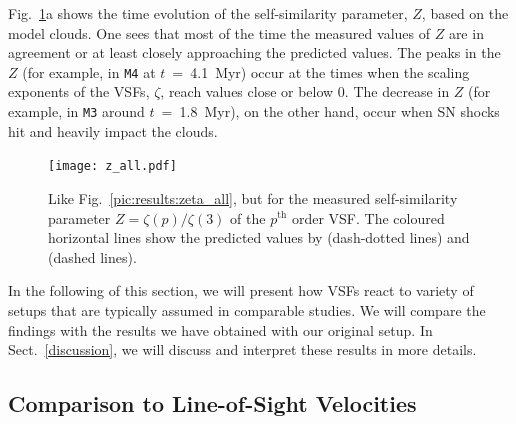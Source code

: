 Fig.~\ref{pic:results:z_all}a shows the time evolution of the self-similarity parameter, $Z$, based on the model clouds. 
One sees that most of the time the measured values of $Z$ are in agreement or at least closely approaching the predicted values.
The peaks in the $Z$ (for example, in \texttt{M4} at $t$~=~4.1~Myr) occur at the times when the scaling exponents of the VSFs, $\zeta$, reach values close or below 0.
The decrease in $Z$ (for example, in \texttt{M3} around $t$~=~1.8~Myr), on the other hand, occur when SN shocks hit and heavily impact the clouds. 

\begin{figure}[!htb]
	\centering
	\texttt{[image: z\_all.pdf]}
	\caption{ Like Fig.~\ref{pic:results:zeta_all}, but for the measured self-similarity parameter $Z = \zeta(p) / \zeta(3)$ of the $p^\mathrm{th}$ order VSF. The coloured horizontal lines show the predicted values by \citet{She1994} (dash-dotted lines) and \citet{Boldyrev2002} (dashed lines).}
	\label{pic:results:z_all}
\end{figure}

In the following of this section, we will present how VSFs react to variety of setups that are typically assumed in comparable studies.
We will compare the findings with the results we have obtained with our original setup.
In Sect.~\ref{discussion}, we will discuss and interpret these results in more details.


\subsection{Comparison to Line-of-Sight Velocities}\label{results:1d}

